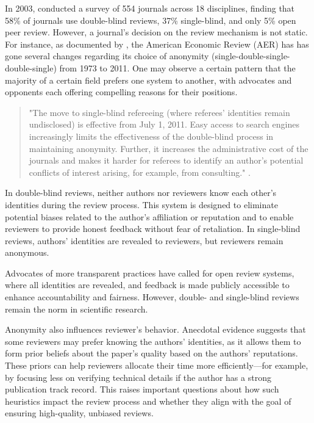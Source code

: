 \documentclass[12pt]{article}
\begin{document}
In 2003, \citet{bachand2003accuracy} conducted a survey of 554 journals across
18 disciplines, finding that 58\% of journals use double-blind reviews, 37\%
single-blind, and only 5\% open peer review. However, a journal's decision on
the review mechanism is not static. For instance, as documented by
\citet{pontille2014blind}, the American Economic Review (AER) has has gone
several changes regarding its choice of anonymity
(single-double-single-double-single) from 1973 to 2011. One may observe a
certain pattern that the majority of a certain field prefers one system to
another, with advocates and opponents each offering compelling reasons for
their positions.

\begin{quote}
    "The move to single-blind refereeing (where referees’ identities remain undisclosed) is effective from July 1, 2011. Easy access to search engines increasingly limits the effectiveness of the double-blind process in maintaining anonymity. Further, it increases the administrative cost of the journals and makes it harder for referees to identify an author's potential conflicts of interest arising, for example, from consulting." \citep{AER2011}.
\end{quote}

In double-blind reviews, neither authors nor reviewers know each other’s
identities during the review process. This system is designed to eliminate
potential biases related to the author’s affiliation or reputation and to
enable reviewers to provide honest feedback without fear of retaliation. In
single-blind reviews, authors’ identities are revealed to reviewers, but
reviewers remain anonymous.

Advocates of more transparent practices have called for open review systems,
where all identities are revealed, and feedback is made publicly accessible to
enhance accountability and fairness. However, double- and single-blind reviews
remain the norm in scientific research.

Anonymity also influences reviewer's behavior. Anecdotal evidence suggests that
some reviewers may prefer knowing the authors’ identities, as it allows them to
form prior beliefs about the paper’s quality based on the authors’ reputations.
These priors can help reviewers allocate their time more efficiently—for
example, by focusing less on verifying technical details if the author has a
strong publication track record. This raises important questions about how such
heuristics impact the review process and whether they align with the goal of
ensuring high-quality, unbiased reviews.
\end{document}
